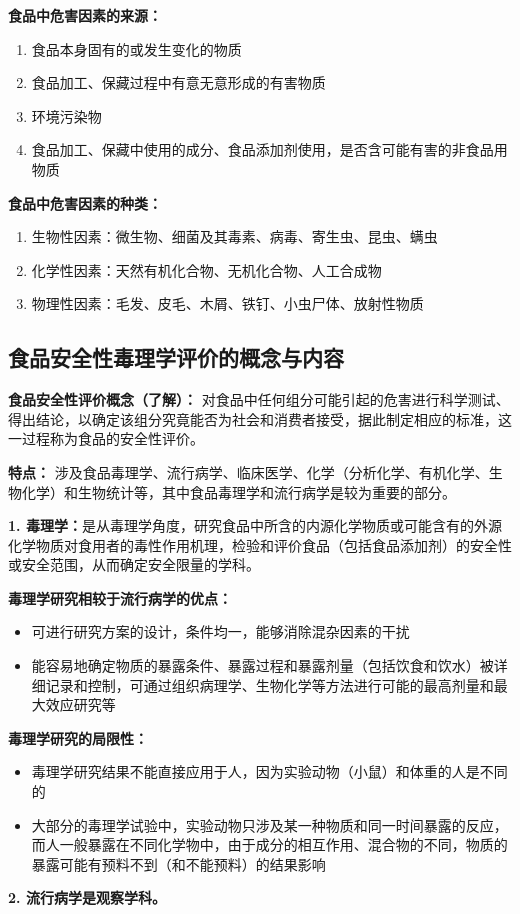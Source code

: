 \begin{defbox}
\textbf{食品中危害因素的来源：}
\begin{enumerate}[leftmargin=*]
    \item 食品本身固有的或发生变化的物质
    \item 食品加工、保藏过程中有意无意形成的有害物质
    \item 环境污染物
    \item 食品加工、保藏中使用的成分、食品添加剂使用，是否含可能有害的非食品用物质
\end{enumerate}

\textbf{食品中危害因素的种类：}
\begin{enumerate}[leftmargin=*]
    \item 生物性因素：微生物、细菌及其毒素、病毒、寄生虫、昆虫、螨虫
    \item 化学性因素：天然有机化合物、无机化合物、人工合成物
    \item 物理性因素：毛发、皮毛、木屑、铁钉、小虫尸体、放射性物质
\end{enumerate}
\end{defbox}

\subsection{食品安全性毒理学评价的概念与内容}

\begin{defbox}
\textbf{食品安全性评价概念（了解）：}
对食品中任何组分可能引起的危害进行科学测试、得出结论，以确定该组分究竟能否为社会和消费者接受，据此制定相应的标准，这一过程称为食品的安全性评价。

\textbf{特点：}
涉及食品毒理学、流行病学、临床医学、化学（分析化学、有机化学、生物化学）和生物统计等，其中食品毒理学和流行病学是较为重要的部分。

\textbf{1. 毒理学：}是从毒理学角度，研究食品中所含的内源化学物质或可能含有的外源化学物质对食用者的毒性作用机理，检验和评价食品（包括食品添加剂）的安全性或安全范围，从而确定安全限量的学科。

\textbf{毒理学研究相较于流行病学的优点：}
\begin{itemize}[leftmargin=*]
    \item 可进行研究方案的设计，条件均一，能够消除混杂因素的干扰
    \item 能容易地确定物质的暴露条件、暴露过程和暴露剂量（包括饮食和饮水）被详细记录和控制，可通过组织病理学、生物化学等方法进行可能的最高剂量和最大效应研究等
\end{itemize}

\textbf{毒理学研究的局限性：}
\begin{itemize}[leftmargin=*]
    \item 毒理学研究结果不能直接应用于人，因为实验动物（小鼠）和体重的人是不同的
    \item 大部分的毒理学试验中，实验动物只涉及某一种物质和同一时间暴露的反应，而人一般暴露在不同化学物中，由于成分的相互作用、混合物的不同，物质的暴露可能有预料不到（和不能预料）的结果影响
\end{itemize}

\textbf{2. 流行病学是观察学科。}
\end{defbox}


